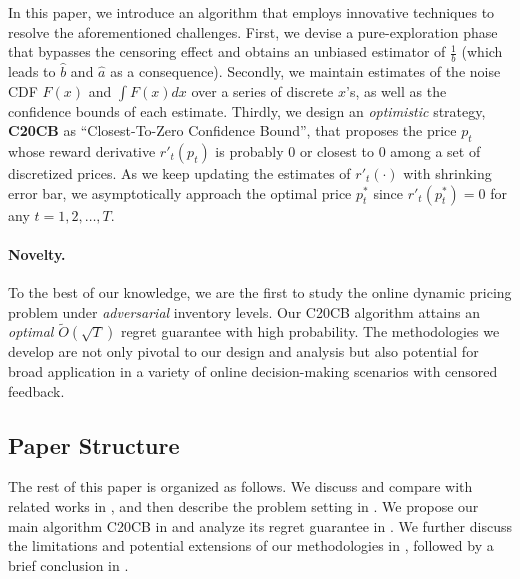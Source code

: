 In this paper, we introduce an algorithm that employs innovative techniques to resolve the aforementioned challenges. First, we devise a pure-exploration phase that bypasses the censoring effect and obtains an unbiased estimator of $\frac1{b}$ (which leads to $\hat b$ and $\hat a$ as a consequence). Secondly, we maintain estimates of the noise CDF $F(x)$ and $\int F(x)dx$ over a series of discrete $x$'s, as well as the confidence bounds of each estimate. Thirdly, we design an \emph{optimistic} strategy, \textbf{C20CB} as ``Closest-To-Zero Confidence Bound'', that proposes the price $p_t$ whose reward derivative $r'_t(p_t)$ is probably $0$ or closest to $0$ among a set of discretized prices. As we keep updating the estimates of $r'_t(\cdot)$ with shrinking error bar, we asymptotically approach the optimal price $p^*_t$ since $r'_t(p_t^*)=0$ for any $t=1,2,\ldots, T$.


\paragraph{Novelty.} To the best of our knowledge, we are the first to study the online dynamic pricing problem under \emph{adversarial} inventory levels. Our C20CB algorithm attains an \emph{optimal} $\tilde{O}(\sqrt{T})$ regret guarantee with high probability. The methodologies we develop are not only pivotal to our design and analysis but also potential for broad application in a variety of online decision-making scenarios with censored feedback.


\subsection{Paper Structure}
\label{subsec:paper_structure}
The rest of this paper is organized as follows. We discuss and compare with related works in , and then describe the problem setting in . We propose our main algorithm C20CB in  and analyze its regret guarantee in . We further discuss the limitations and potential extensions of our methodologies in , followed by a brief conclusion in .